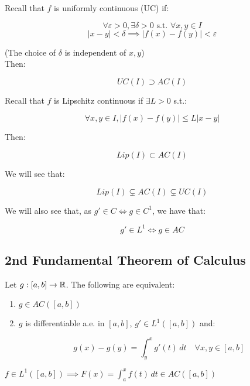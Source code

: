 \begin{fremark}
    Recall that $f$ is uniformly continuous (UC) if:

    $$\forall \varepsilon > 0, \exists \delta > 0 \text{ s.t. } \forall x, y \in I$$
    $$|x - y| < \delta \implies |f(x) - f(y)| < \varepsilon$$

    (The choice of $\delta$ is independent of $x, y$)\\

    Then:

    $$UC(I) \supset AC(I)$$
    
    Recall that $f$ is Lipschitz continuous if $\exists L > 0$ s.t.:

    $$\forall x, y \in I, |f(x) - f(y)| \leq L|x - y|$$

    Then:

    $$Lip(I) \subset AC(I)$$

    We will see that:

    $$Lip(I) \subsetneq AC(I) \subsetneq UC(I)$$

    We will also see that, as $g' \in C \iff g \in C^1$, we have that:

    $$g' \in L^1 \iff g \in AC$$
\end{fremark}

\subsection{2nd Fundamental Theorem of Calculus}

\begin{ftheorem}
    Let $g: [a, b] \to \mathbb{R}$. The following are equivalent:
    \vspace{1em}
    \begin{enumerate}[label=(\roman*)]
        \item $g \in AC([a, b])$
        \vspace{1em}
        \item $g$ is differentiable a.e. in $[a, b]$, $g' \in L^1([a, b])$
        and:

        $$g(x) - g(y) = \int_y^x g'(t) \, dt \quad \forall x, y \in [a, b]$$
    \end{enumerate}
\end{ftheorem}

\begin{fcorollary}
    $f \in L^1([a, b]) \implies F(x) = \int_a^x f(t) \, dt \in AC([a, b])$
\end{fcorollary}

